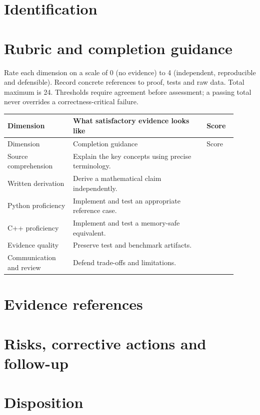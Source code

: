 \documentclass[11pt,letterpaper]{article}
\begin{document}
\tableofcontents
\clearpage
{}
\section{Identification}
\section{Rubric and completion guidance}
Rate each dimension on a scale of 0 (no evidence) to 4 (independent, reproducible and defensible). Record concrete references to proof, tests and raw data. Total maximum is 24. Thresholds require agreement before assessment; a passing total never overrides a correctness-critical failure.
\small
\begin{longtable}{@{}p{0.26\linewidth}p{0.53\linewidth}p{0.12\linewidth}@{}}\toprule Dimension & What satisfactory evidence looks like & Score\\\midrule\endfirsthead\toprule Dimension & Completion guidance & Score\\\midrule\endhead
Source comprehension & Explain the key concepts using precise terminology. & \\[1.0em]
Written derivation & Derive a mathematical claim independently. & \\[1.0em]
Python proficiency & Implement and test an appropriate reference case. & \\[1.0em]
C++ proficiency & Implement and test a memory-safe equivalent. & \\[1.0em]
Evidence quality & Preserve test and benchmark artifacts. & \\[1.0em]
Communication and review & Defend trade-offs and limitations. & \\[1.0em]
\bottomrule\end{longtable}
\normalsize\section{Evidence references}
\section{Risks, corrective actions and follow-up}
\section{Disposition}
\end{document}

